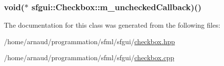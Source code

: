 \hypertarget{classsfgui_1_1Checkbox_c2420a43e7e62ae3cb0023e8392d3cfd}{
\subsubsection[m\_\-uncheckedCallback]{\setlength{\rightskip}{0pt plus 5cm}void($\ast$ {\bf sfgui::Checkbox::m\_\-uncheckedCallback})()}}
\label{classsfgui_1_1Checkbox_c2420a43e7e62ae3cb0023e8392d3cfd}




The documentation for this class was generated from the following files:\begin{CompactItemize}
\item 
/home/arnaud/programmation/sfml/sfgui/\hyperlink{checkbox_8hpp}{checkbox.hpp}\item 
/home/arnaud/programmation/sfml/sfgui/\hyperlink{checkbox_8cpp}{checkbox.cpp}\end{CompactItemize}
